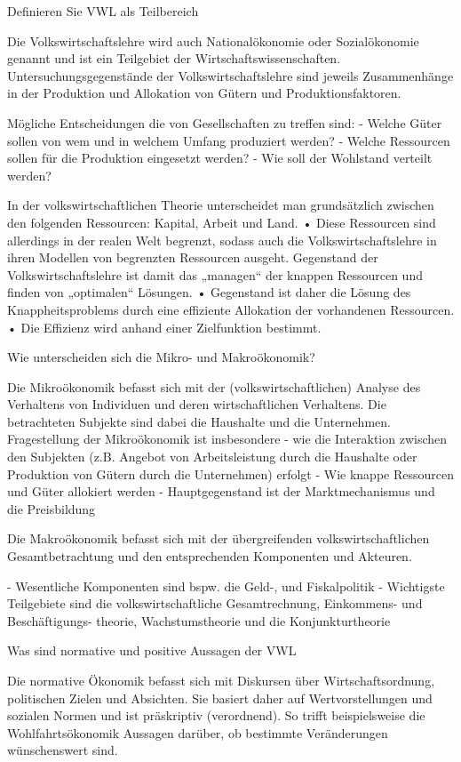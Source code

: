 Definieren Sie VWL als Teilbereich

Die Volkswirtschaftslehre wird auch Nationalökonomie oder Sozialökonomie genannt
und ist ein Teilgebiet der Wirtschaftswissenschaften.
Untersuchungsgegenstände der Volkswirtschaftslehre sind jeweils Zusammenhänge
in der Produktion und Allokation von Gütern und Produktionsfaktoren.

Mögliche Entscheidungen die von Gesellschaften zu treffen sind:
- Welche Güter sollen von wem und in welchem Umfang produziert werden?
- Welche Ressourcen sollen für die Produktion eingesetzt werden?
- Wie soll der Wohlstand verteilt werden?

In der volkswirtschaftlichen Theorie unterscheidet man grundsätzlich
zwischen den folgenden Ressourcen: Kapital, Arbeit und Land.
• Diese Ressourcen sind allerdings in der realen Welt begrenzt, sodass
auch die Volkswirtschaftslehre in ihren Modellen von begrenzten
Ressourcen ausgeht. Gegenstand der Volkswirtschaftslehre ist damit
das „managen“ der knappen Ressourcen und finden von „optimalen“
Lösungen.
• Gegenstand ist daher die Lösung des Knappheitsproblems durch eine
effiziente Allokation der vorhandenen Ressourcen.
• Die Effizienz wird anhand einer Zielfunktion bestimmt.


Wie unterscheiden sich die Mikro- und Makroökonomik?

Die Mikroökonomik befasst sich mit der (volkswirtschaftlichen) Analyse des Verhaltens von
Individuen und deren wirtschaftlichen Verhaltens. 
Die betrachteten Subjekte sind dabei die
Haushalte und die Unternehmen. 
Fragestellung der Mikroökonomik ist insbesondere
- wie die Interaktion zwischen den Subjekten (z.B. Angebot von Arbeitsleistung durch die
Haushalte oder Produktion von Gütern durch die Unternehmen) erfolgt
- Wie knappe Ressourcen und Güter allokiert werden 
- Hauptgegenstand ist der Marktmechanismus und die Preisbildung


Die Makroökonomik befasst sich mit der übergreifenden
volkswirtschaftlichen Gesamtbetrachtung und den
entsprechenden Komponenten und Akteuren.

- Wesentliche Komponenten sind bspw. die Geld-, und
Fiskalpolitik
- Wichtigste Teilgebiete sind die volkswirtschaftliche
Gesamtrechnung, Einkommens- und Beschäftigungs-
theorie, Wachstumstheorie und die Konjunkturtheorie


Was sind normative und positive Aussagen der VWL


Die normative Ökonomik befasst sich mit Diskursen über
Wirtschaftsordnung, politischen Zielen und Absichten.
Sie basiert daher auf Wertvorstellungen und sozialen Normen und
ist präskriptiv (verordnend).
So trifft beispielsweise die Wohlfahrtsökonomik
Aussagen darüber, ob bestimmte Veränderungen wünschenswert sind.

